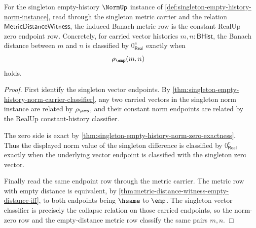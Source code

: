 \begin{theorem}
\label{thm:banach-norm-induced-metric-compatibility}
For the singleton empty-history $\NormUp$ instance of
\autoref{def:singleton-empty-history-norm-instance}, read through the
singleton metric carrier and the relation
$\mathsf{MetricDistanceWitness}$, the induced Banach metric row is the
constant RealUp zero endpoint row. Concretely, for carried vector histories
$m,n:\mathsf{BHist}$, the Banach distance between $m$ and $n$ is classified by
$0_{\mathsf{Real}}^{c}$ exactly when
$$
\rho_{\emp}(m,n)
$$
holds.
\end{theorem}
\begin{proof}
First identify the singleton vector endpoints. By
\autoref{thm:singleton-empty-history-norm-carrier-classifier}, any two carried
vectors in the singleton norm instance are related by $\rho_{\emp}$, and their
constant norm endpoints are related by the RealUp constant-history
classifier.

The zero side is exact by
\autoref{thm:singleton-empty-history-norm-zero-exactness}. Thus the displayed
norm value of the singleton difference is classified by
$0_{\mathsf{Real}}^{c}$ exactly when the underlying vector endpoint is
classified with the singleton zero vector.

Finally read the same endpoint row through the metric carrier. The metric row
with empty distance is equivalent, by
\autoref{thm:metric-distance-witness-empty-distance-iff}, to both endpoints
being $\hsame$ to $\emp$. The singleton vector classifier is precisely the
collapse relation on those carried endpoints, so the norm-zero row and the
empty-distance metric row classify the same pairs $m,n$.
\end{proof}

